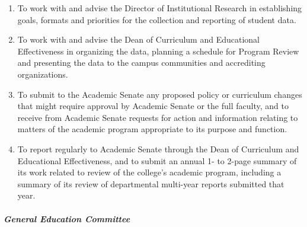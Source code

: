 \begin{enumerate}[label=\alph*)]
{\begin{enumerate}[label=\arabic*)]
{\begin{enumerate}[label=(\alph*)]
										\item{to review the results of the multi-year review and provide timely feedback for the department to consider for its meeting with the Provost and the Dean of Curriculum and Educational Effectiveness;}
										\item{to provide the department with comments or suggestions to assist them in their preparation for the next review cycle;}
										\item{to encourage a campus conversation that establishes the value of a college-wide program review and addresses concerns as appropriate.}
									\end{enumerate}
								}
								\item{To work with and advise the Director of Institutional Research in establishing goals, formats and priorities for the collection and reporting of student data.}
								\item{To work with and advise the Dean of Curriculum and Educational Effectiveness in organizing the data, planning a schedule for Program Review and presenting the data to the campus communities and accrediting organizations.}
								\item{To submit to the Academic Senate any proposed policy or curriculum changes that might require approval by Academic Senate or the full faculty, and to receive from Academic Senate requests for action and information relating to matters of the academic program appropriate to its purpose and function.}
								\item{To report regularly to Academic Senate through the Dean of Curriculum and Educational Effectiveness, and to submit an annual 1- to 2-page summary of its work related to review of the college's academic program, including a summary of its review of departmental multi-year reports submitted that year.}
							\end{enumerate}
						}
					\end{enumerate}
				\subparagraph{General Education Committee}
